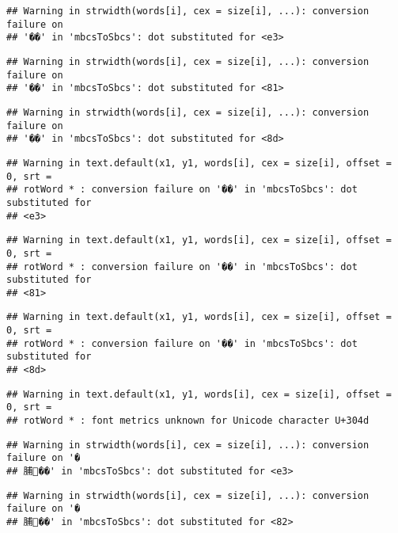 \documentclass[]{article}
\begin{document}
\begin{verbatim}
## Warning in strwidth(words[i], cex = size[i], ...): conversion failure on
## '��' in 'mbcsToSbcs': dot substituted for <e3>
\end{verbatim}

\begin{verbatim}
## Warning in strwidth(words[i], cex = size[i], ...): conversion failure on
## '��' in 'mbcsToSbcs': dot substituted for <81>
\end{verbatim}

\begin{verbatim}
## Warning in strwidth(words[i], cex = size[i], ...): conversion failure on
## '��' in 'mbcsToSbcs': dot substituted for <8d>
\end{verbatim}

\begin{verbatim}
## Warning in text.default(x1, y1, words[i], cex = size[i], offset = 0, srt =
## rotWord * : conversion failure on '��' in 'mbcsToSbcs': dot substituted for
## <e3>
\end{verbatim}

\begin{verbatim}
## Warning in text.default(x1, y1, words[i], cex = size[i], offset = 0, srt =
## rotWord * : conversion failure on '��' in 'mbcsToSbcs': dot substituted for
## <81>
\end{verbatim}

\begin{verbatim}
## Warning in text.default(x1, y1, words[i], cex = size[i], offset = 0, srt =
## rotWord * : conversion failure on '��' in 'mbcsToSbcs': dot substituted for
## <8d>
\end{verbatim}

\begin{verbatim}
## Warning in text.default(x1, y1, words[i], cex = size[i], offset = 0, srt =
## rotWord * : font metrics unknown for Unicode character U+304d
\end{verbatim}

\begin{verbatim}
## Warning in strwidth(words[i], cex = size[i], ...): conversion failure on '�
## 脯��' in 'mbcsToSbcs': dot substituted for <e3>
\end{verbatim}

\begin{verbatim}
## Warning in strwidth(words[i], cex = size[i], ...): conversion failure on '�
## 脯��' in 'mbcsToSbcs': dot substituted for <82>
\end{verbatim}
\end{document}
